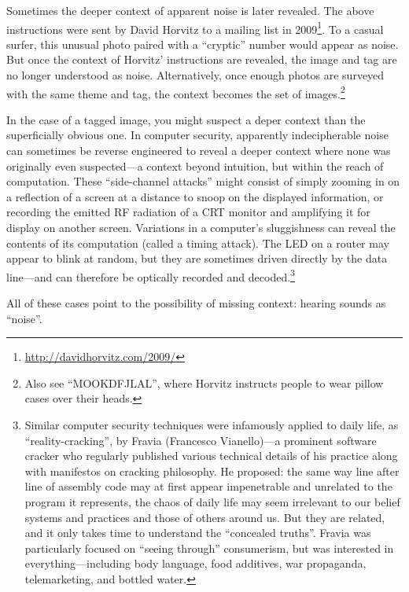 \documentclass{thesis}
\begin{document}
Sometimes the deeper context of apparent noise is later revealed. The above instructions were sent by David Horvitz to a mailing list in 2009\footnote{\url{http://davidhorvitz.com/2009/}}. To a casual surfer, this unusual photo paired with a ``cryptic'' number\cite{david_horvitz_flickr:_????-1} would appear as noise. But once the context of Horvitz' instructions are revealed, the image and tag are no longer understood as noise. Alternatively, once enough photos are surveyed with the same theme and tag, the context becomes the set of images.\footnote{Also see ``MOOKDFJLAL''\cite{david_horvitz_flickr:_????}, where Horvitz instructs people to wear pillow cases over their heads.}

In the case of a tagged image, you might suspect a deper context than the superficially obvious one. In computer security, apparently indecipherable noise can sometimes be reverse engineered to reveal a deeper context where none was originally even suspected---a context beyond intuition, but within the reach of computation. These ``side-channel attacks'' might consist of simply zooming in on a reflection of a screen at a distance to snoop on the displayed information,\cite{w._wayt_gibbs_hackers_2009} or recording the emitted RF radiation of a CRT monitor and amplifying it for display on another screen.\cite{erik_thiele_tempest_????} Variations in a computer's sluggishness can reveal the contents of its computation (called a timing attack). The LED on a router may appear to blink at random, but they are sometimes driven directly by the data line---and can therefore be optically recorded and decoded.\footnote{Similar computer security techniques were infamously applied to daily life, as ``reality-cracking''\cite{francesco_vianello_reality_????}, by Fravia (Francesco Vianello)---a prominent software cracker who regularly published various technical details of his practice along with manifestos on cracking philosophy. He proposed: the same way line after line of assembly code may at first appear impenetrable and unrelated to the program it represents, the chaos of daily life may seem irrelevant to our belief systems and practices and those of others around us. But they are related, and it only takes time to understand the ``concealed truths''. Fravia was particularly focused on ``seeing through'' consumerism, but was interested in everything---including body language, food additives, war propaganda, telemarketing, and bottled water.}

All of these cases point to the possibility of missing context: hearing sounds as ``noise''.
\end{document}
